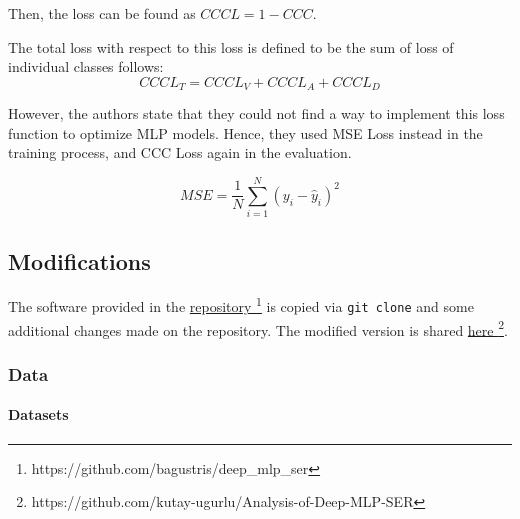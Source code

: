 \documentclass[a4paper,11pt]{article}
\begin{document}
Then, the loss can be found as $CCCL = 1 - CCC$.

The total loss with respect to this loss is defined to be the sum of loss of individual classes follows:
\begin{equation}
    CCCL_T = CCCL_V + CCCL_A + CCCL_D
    \label{eq:CCCLoss}
\end{equation}

However, the authors state that they could not find a way to implement this loss function to optimize MLP models. Hence, they used MSE Loss instead in the training process, and CCC Loss again in the evaluation. 

\begin{equation}
    MSE = \frac{1}{N}\sum_{i=1}^N (y_i -{\hat{y}}_i)^2
\end{equation}

\pagebreak

\subsection{Modifications}

The software provided in the \href{https://github.com/bagustris/deep_mlp_ser}{repository \faExternalLink*} \footnote{https://github.com/bagustris/deep\_mlp\_ser} is copied via \texttt{git clone} and some additional changes made on the repository. The modified version is shared \href{https://github.com/kutay-ugurlu/Analysis-of-Deep-MLP-SER}{here \faExternalLink*} \footnote{ https://github.com/kutay-ugurlu/Analysis-of-Deep-MLP-SER}.

\subsubsection{Data}\label{subsec:MELDdata}

\paragraph{Datasets}
\end{document}
